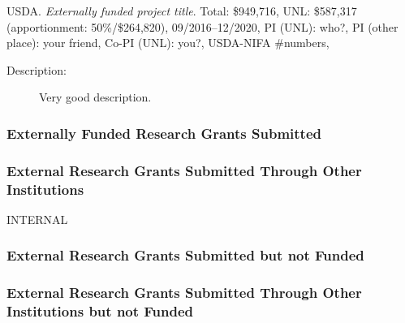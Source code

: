 \begin{revgrantsenum}
\item USDA. \emph{Externally funded project title}. Total: \$949,716, UNL:
  \$587,317 (apportionment: 50\%/\$264,820), 09/2016–12/2020, PI (UNL): who?, PI
  (other place): your friend, Co-PI (UNL): you?, USDA-NIFA \#numbers,
  \begin{description}
  \item[Description:] Very good description.
  \end{description}

\end{revgrantsenum}

\subsubsection{Externally Funded Research Grants Submitted}

\subsubsection{External Research Grants Submitted Through Other Institutions}



\begin{taggedblock}{INTERNAL}

  \subsubsection{External Research Grants Submitted but not Funded}

\end{taggedblock}

\subsubsection{External Research Grants Submitted Through Other Institutions but
  not Funded}

